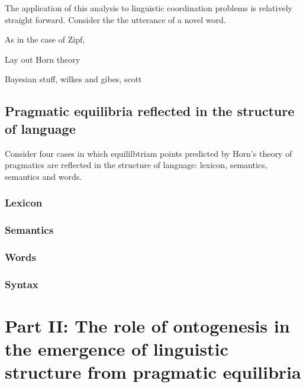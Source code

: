 \documentclass[man, noapacite, 12pt]{apa2}
\begin{document}
The application of this analysis to linguistic coordination problems is relatively straight forward. Consider the the utterance of a novel word.

As in the case of Zipf, 

Lay out Horn theory

Bayesian stuff, wilkes and gibes, scott

\subsection{Pragmatic equilibria reflected in the structure of language}
Consider four cases in which equililbtriam points predicted by Horn's theory of pragmatics are reflected in the structure of language: lexicon, semantics, semantics and words.

\subsubsection{Lexicon}
\subsubsection{Semantics}
\subsubsection{Words}
\subsubsection{Syntax}

\section{Part II: The role of ontogenesis in the emergence of linguistic structure from pragmatic equilibria}




\end{document}

